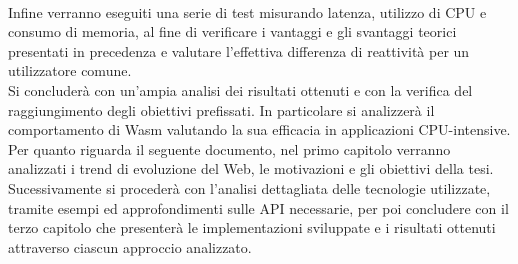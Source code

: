 \\Infine verranno eseguiti una serie di test misurando latenza, utilizzo di CPU e consumo di memoria, al fine di verificare i vantaggi e gli svantaggi teorici presentati in precedenza e valutare l'effettiva differenza di reattività per un utilizzatore comune.
\\Si concluderà con un'ampia analisi dei risultati ottenuti e con la verifica del raggiungimento degli obiettivi prefissati. In particolare si analizzerà il comportamento di Wasm valutando la sua efficacia in applicazioni CPU-intensive.
\\Per quanto riguarda il seguente documento, nel primo capitolo verranno analizzati i trend di evoluzione del Web, le motivazioni e gli obiettivi della tesi.
Sucessivamente si procederà con l'analisi dettagliata delle tecnologie utilizzate, tramite esempi ed approfondimenti sulle API necessarie, per poi concludere con il terzo capitolo che presenterà le implementazioni sviluppate e i risultati ottenuti attraverso ciascun approccio analizzato.
